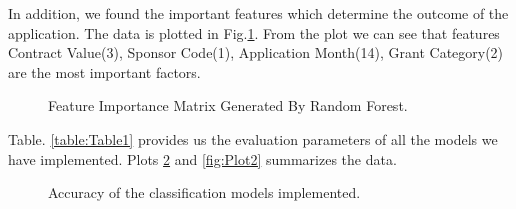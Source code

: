 \documentclass{article} %
\begin{document}
	In addition, we found the important features which determine the outcome of the application. The data is plotted in Fig.\ref{fig:FIM}. From the plot we can see that features Contract Value(3), Sponsor Code(1), Application Month(14), Grant Category(2) are the most important factors.
	
	\begin{figure}[h]
		\begin{center}
		\end{center}
		\caption{Feature Importance Matrix Generated By Random Forest.}
		\label{fig:FIM}
	\end{figure}
	
		Table. \ref{table:Table1} provides us the evaluation parameters of all the models we have implemented. Plots \ref{fig:Plot1} and \ref{fig:Plot2} summarizes the data. 
		
		\begin{figure}[h]
			\begin{center}
			\end{center}
			\caption{Accuracy of the classification models implemented.}
			\label{fig:Plot1}
		\end{figure}
		
\end{document}
